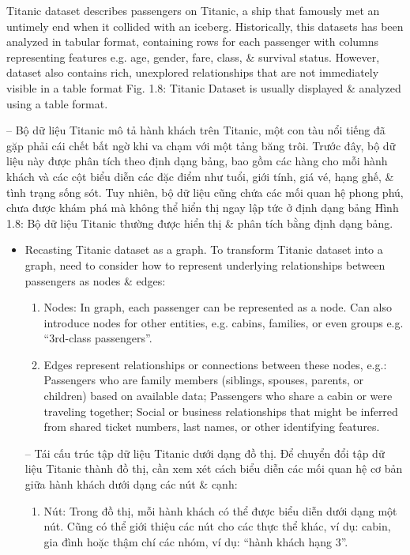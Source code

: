 \documentclass{article}
\begin{document}
\begin{itemize}
\begin{itemize}
\begin{itemize}
            Titanic dataset describes passengers on Titanic, a ship that famously met an untimely end when it collided with an iceberg. Historically, this datasets has been analyzed in tabular format, containing rows for each passenger with columns representing features e.g. age, gender, fare, class, \& survival status. However, dataset also contains rich, unexplored relationships that are not immediately visible in a table format {\sf Fig. 1.8: Titanic Dataset is usually displayed \& analyzed using a table format.}

            -- Bộ dữ liệu Titanic mô tả hành khách trên Titanic, một con tàu nổi tiếng đã gặp phải cái chết bất ngờ khi va chạm với một tảng băng trôi. Trước đây, bộ dữ liệu này được phân tích theo định dạng bảng, bao gồm các hàng cho mỗi hành khách và các cột biểu diễn các đặc điểm như tuổi, giới tính, giá vé, hạng ghế, \& tình trạng sống sót. Tuy nhiên, bộ dữ liệu cũng chứa các mối quan hệ phong phú, chưa được khám phá mà không thể hiển thị ngay lập tức ở định dạng bảng {\sf Hình 1.8: Bộ dữ liệu Titanic thường được hiển thị \& phân tích bằng định dạng bảng.}
            \begin{itemize}
                \item {\sf Recasting Titanic dataset as a graph.} To transform Titanic dataset into a graph, need to consider how to represent underlying relationships between passengers as nodes \& edges:
                \begin{enumerate}
                    \item Nodes: In graph, each passenger can be represented as a node. Can also introduce nodes for other entities, e.g. cabins, families, or even groups e.g. ``3rd-class passengers''.
                    \item Edges represent relationships or connections between these nodes, e.g.: Passengers who are family members (siblings, spouses, parents, or children) based on available data; Passengers who share a cabin or were traveling together; Social or business relationships that might be inferred from shared ticket numbers, last names, or other identifying features.
                \end{enumerate}
                -- {\sf Tái cấu trúc tập dữ liệu Titanic dưới dạng đồ thị.} Để chuyển đổi tập dữ liệu Titanic thành đồ thị, cần xem xét cách biểu diễn các mối quan hệ cơ bản giữa hành khách dưới dạng các nút \& cạnh:
                \begin{enumerate}
                    \item Nút: Trong đồ thị, mỗi hành khách có thể được biểu diễn dưới dạng một nút. Cũng có thể giới thiệu các nút cho các thực thể khác, ví dụ: cabin, gia đình hoặc thậm chí các nhóm, ví dụ: ``hành khách hạng 3''.

\end{enumerate}
\end{itemize}
\end{itemize}
\end{itemize}
\end{itemize}
\end{document}
